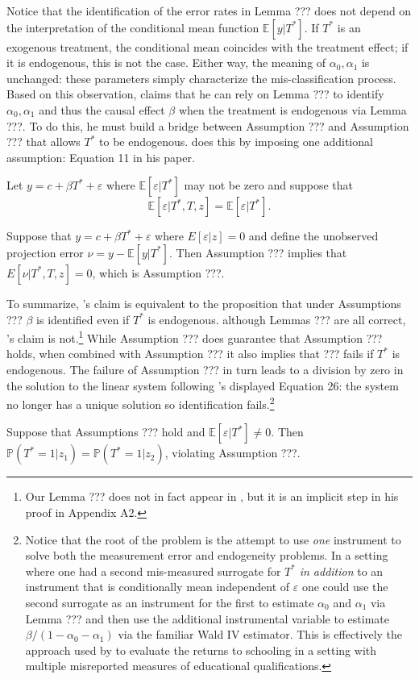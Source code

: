Notice that the identification of the error rates in Lemma ??? does not depend on the interpretation of the conditional mean function $\mathbb{E}[y|T^*]$.
If $T^*$ is an exogenous treatment, the conditional mean coincides with the treatment effect; if it is endogenous, this is not the case.
Either way, the meaning of $\alpha_0, \alpha_1$ is unchanged: these parameters simply characterize the mis-classification process. 
Based on this observation, \cite{Mahajan} claims that he can rely on Lemma ??? to identify $\alpha_0,\alpha_1$ and thus the causal effect $\beta$ when the treatment is endogenous via Lemma ???.
To do this, he must build a bridge between Assumption ??? and Assumption ??? that allows $T^*$ to be endogenous.
\cite{Mahajan} does this by imposing one additional assumption: Equation 11 in his paper.
\begin{assump}
  Let $y = c + \beta T^* + \varepsilon$ where $\mathbb{E}[\varepsilon|T^*]$ may not be zero and suppose that 
  \[\mathbb{E}[\varepsilon|T^*,T,z] = \mathbb{E}[\varepsilon|T^*].\]
\end{assump}
\begin{lem}
  Suppose that $y = c + \beta T^* + \varepsilon$ where $E[\varepsilon|z]=0$ and define the unobserved projection error $\nu = y - \mathbb{E}[y|T^*]$.
  Then Assumption ??? implies that $E[\nu|T^*,T,z]=0$, which is Assumption ???.
\end{lem}

To summarize, \citeauthor{Mahajan}'s claim is equivalent to the proposition that under Assumptions ??? $\beta$ is identified even if $T^*$ is endogenous.
although Lemmas ??? are all correct, \citeauthor{Mahajan}'s claim is not.\footnote{Our Lemma ??? does not in fact appear in \cite{Mahajan}, but it is an implicit step in his proof in Appendix A2.}
While Assumption ??? does guarantee that Assumption ??? holds, when combined with Assumption ??? it also implies that ??? fails if $T^*$ is endogenous.
The failure of Assumption ??? in turn leads to a division by zero in the solution to the linear system following \citeauthor{Mahajan}'s displayed Equation 26: the system no longer has a unique solution so identification fails.\footnote{Notice that the root of the problem is the attempt to use \emph{one} instrument to solve both the measurement error and endogeneity problems. In a setting where one had a second mis-measured surrogate for $T^*$ \emph{in addition} to an instrument that is conditionally mean independent of $\varepsilon$ one could use the second surrogate as an instrument for the first to estimate $\alpha_0$ and $\alpha_1$ via Lemma ??? and then use the additional instrumental variable to estimate $\beta/(1 - \alpha_0 - \alpha_1)$ via the familiar Wald IV estimator. This is effectively the approach used by \cite{Batt} to evaluate the returns to schooling in a setting with multiple misreported measures of educational qualifications.}
\begin{pro}
  Suppose that Assumptions ??? hold and $\mathbb{E}[\varepsilon|T^*]\neq0$. Then $\mathbb{P}(T^*=1|z_1) = \mathbb{P}(T^*=1|z_2)$, violating Assumption ???. 
\end{pro}


